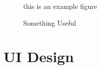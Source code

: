 \documentclass[11pt,letterpaper]{article}
\begin{document}
\begin{figure}[H]
    \centering
    this is an example figure
    \caption{Something Useful}
    \label{fig:example}
\end{figure}

\section{UI Design}



\clearpage
\nocite{*}
\printbibliography[title={References}]
\end{document}
